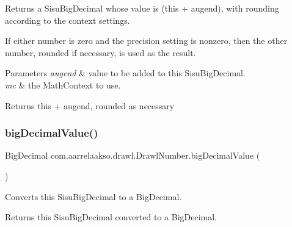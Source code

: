 Returns a Sisu\+Big\+Decimal whose value is (this + augend), with rounding according to the context settings. 

If either number is zero and the precision setting is nonzero, then the other number, rounded if necessary, is used as the result.


\begin{DoxyParams}{Parameters}
{\em augend} & value to be added to this Sisu\+Big\+Decimal. \\
\hline
{\em mc} & the Math\+Context to use. \\
\hline
\end{DoxyParams}
\begin{DoxyReturn}{Returns}
this + augend, rounded as necessary 
\end{DoxyReturn}
\mbox{\label{classcom_1_1aarrelaakso_1_1drawl_1_1_drawl_number_acf97abc572acd173a4d8cd6c5b5c2ecd}} 
\subsubsection{\texorpdfstring{big\+Decimal\+Value()}{bigDecimalValue()}}
{\footnotesize\ttfamily Big\+Decimal com.\+aarrelaakso.\+drawl.\+Drawl\+Number.\+big\+Decimal\+Value (\begin{DoxyParamCaption}{ }\end{DoxyParamCaption})\hspace{0.3cm}{\ttfamily [protected]}}



Converts this Sisu\+Big\+Decimal to a Big\+Decimal. 

\begin{DoxyReturn}{Returns}
this Sisu\+Big\+Decimal converted to a Big\+Decimal. 
\end{DoxyReturn}
\mbox{\label{classcom_1_1aarrelaakso_1_1drawl_1_1_drawl_number_a6bab13fc3993e590f3b4f0198b0c8ee4}} 
